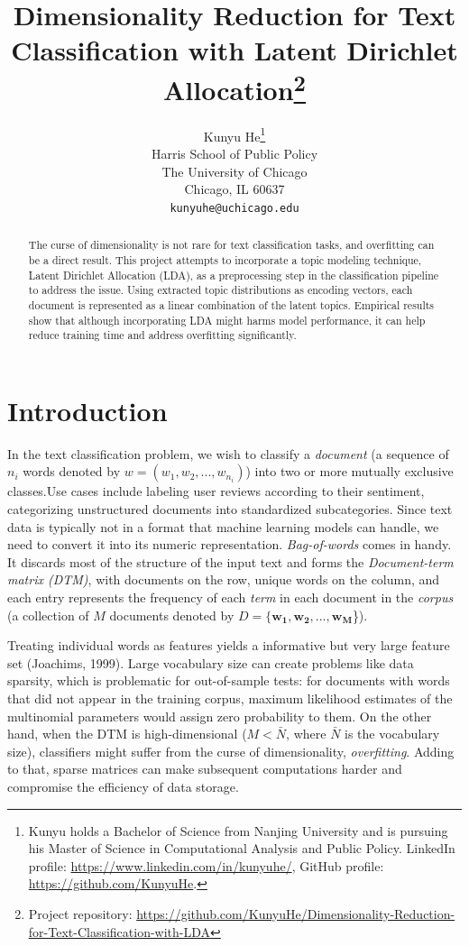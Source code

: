 \documentclass{article}
\title{Dimensionality Reduction for Text Classification with Latent Dirichlet Allocation\thanks{Project repository: \url{https://github.com/KunyuHe/Dimensionality-Reduction-for-Text-Classification-with-LDA}}}
\author{%
  Kunyu He\thanks{Kunyu holds a Bachelor of Science from Nanjing University and is pursuing his Master of Science in Computational Analysis and Public Policy. LinkedIn profile: \url{https://www.linkedin.com/in/kunyuhe/}, GitHub profile: \url{https://github.com/KunyuHe}.}\\
  Harris School of Public Policy\\
  The University of Chicago\\
  Chicago, IL 60637 \\
  \texttt{kunyuhe@uchicago.edu}
}
\begin{document}
\maketitle

\begin{abstract}
The curse of dimensionality is not rare for text classification tasks, and overfitting can be a direct result. This project attempts to incorporate a topic modeling technique, Latent Dirichlet Allocation (LDA), as a preprocessing step in the classification pipeline to address the issue. Using extracted topic distributions as encoding vectors, each document is represented as a linear combination of the latent topics.  Empirical results show that although incorporating LDA might harms model performance, it can help reduce training time and address overfitting significantly.
\end{abstract}

\section{Introduction}
\label{intro}

In the text classification problem, we wish to classify a \emph{document} (a sequence of $n_i$ words denoted by $w=(w_1, w_2, ..., w_{n_i})$) into two or more mutually exclusive classes.Use cases include labeling user reviews according to their sentiment, categorizing unstructured documents into standardized subcategories. Since text data is typically not in a format that machine learning models can handle, we need to convert it into its numeric representation. \emph{Bag-of-words} comes in handy. It discards most of the structure of the input text and forms the \emph{Document-term matrix (DTM)}, with documents on the row, unique words on the column, and each entry represents the frequency of each \emph{term} in each document in the \emph{corpus} (a collection of $M$ documents denoted by $D = \{\bm{w_1}, \bm{w_2}, ..., \bm{w_M}$\}).

Treating individual words as features yields a informative but very large feature set (Joachims, 1999). Large vocabulary size can create problems like data sparsity, which is problematic for out-of-sample tests: for documents with words that did not appear in the training corpus, maximum likelihood estimates of the multinomial parameters would assign zero probability to them. On the other hand, when the DTM is high-dimensional ($M< \bar{N}$, where $\bar{N}$ is the vocabulary size), classifiers might suffer from the curse of dimensionality, \emph{overfitting}. Adding to that, sparse matrices can make subsequent computations harder and compromise the efficiency of data storage.
\end{document}
